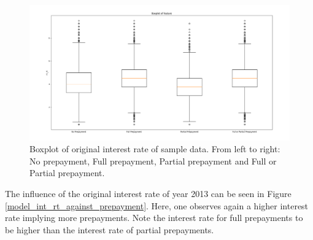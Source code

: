     \begin{figure}[H]
        \centering
        \includegraphics[width=\linewidth]{Figures/Boxplot_of_int_rt_[2013, 2014, 2015, 2016, 2017, 2018, 2019, 2020]_.png}
        \caption{
            Boxplot of original interest rate of sample data. 
            From left to right: No prepayment, Full prepayment, 
            Partial prepayment and Full or Partial prepayment.
            }
        \label{model_boxplot_int_rt}
    \end{figure}
    \noindent
    The influence of the original interest rate of year 2013 can be 
    seen in Figure \ref{model_int_rt_against_prepayment}. Here, 
    one observes again a higher interest rate implying more 
    prepayments. Note the interest rate for full prepayments to 
    be higher than the interest rate of partial prepayments. 
